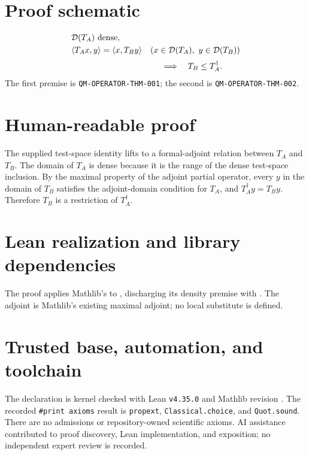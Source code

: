 \documentclass[11pt]{article}
\begin{document}
\section{Proof schematic}
\[
\begin{aligned}
&\mathcal D(T_A)\text{ dense},\\
&\langle T_Ax,y\rangle=\langle x,T_By\rangle
  \quad(x\in\mathcal D(T_A),\ y\in\mathcal D(T_B))
\\[2pt]
&\hspace{38mm}\Longrightarrow\quad T_B\leq T_A^{\dagger}.
\end{aligned}
\]
The first premise is \texttt{QM-OPERATOR-THM-001}; the second is
\texttt{QM-OPERATOR-THM-002}.

\section{Human-readable proof}
The supplied test-space identity lifts to a formal-adjoint relation between $T_A$ and $T_B$.
The domain of $T_A$ is dense because it is the range of the dense test-space inclusion. By the
maximal property of the adjoint partial operator, every $y$ in the domain of $T_B$ satisfies the
adjoint-domain condition for $T_A$, and $T_A^{\dagger}y=T_By$. Therefore $T_B$ is a restriction of
$T_A^{\dagger}$.

\section{Lean realization and library dependencies}
The proof applies Mathlib's  to
, discharging its density premise with
. The adjoint is Mathlib's existing maximal adjoint; no local
substitute is defined.

\section{Trusted base, automation, and toolchain}
The declaration is kernel checked with Lean \texttt{v4.35.0} and Mathlib revision
. The recorded \texttt{\#print axioms} result is
\texttt{propext}, \texttt{Classical.choice}, and \texttt{Quot.sound}. There are no admissions or
repository-owned scientific axioms. AI assistance contributed to proof discovery, Lean
implementation, and exposition; no independent expert review is recorded.
\end{document}
